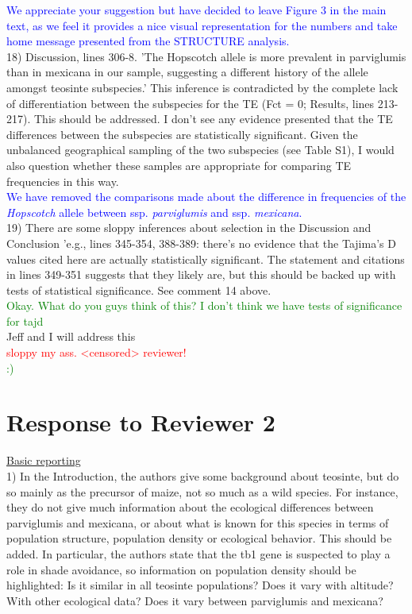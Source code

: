 \documentclass[11pt]{article}
\newcommand{\res}[1]{\noindent \textcolor{blue}{{#1}} \\}
\newcommand{\jri}[1]{\noindent \textcolor{red}{{#1}} \\}
\newcommand{\lev}[1]{\noindent \textcolor{green}{{#1}} \\}
\newcommand{\mbh}[1]{\noindent \textcolor{Dandelion}{{#1}}\\}
\begin{document}
\res{We appreciate your suggestion but have decided to leave Figure 3 in the main text, as we feel it provides a nice visual representation for the numbers and take home message presented from the STRUCTURE analysis.}

18) Discussion, lines 306-8. 'The Hopscotch allele is more prevalent in parviglumis than in mexicana in our sample, suggesting a different history of the allele amongst teosinte subspecies.' This inference is contradicted by the complete lack of differentiation between the subspecies for the TE (Fct = 0; Results, lines 213-217). This should be addressed. I don't see any evidence presented that the TE differences between the subspecies are statistically significant. Given the unbalanced geographical sampling of the two subspecies (see Table S1), I would also question whether these samples are appropriate for comparing TE frequencies in this way. \\

\res{We have removed the comparisons made about the difference in frequencies of the \emph{Hopscotch} allele between ssp. \emph{parviglumis} and ssp. \emph{mexicana}.}

19) There are some sloppy inferences about selection in the Discussion and Conclusion 'e.g., lines 345-354, 388-389: there's no evidence that the Tajima's D values cited here are actually statistically significant. The statement and citations in lines 349-351 suggests that they likely are, but this should be backed up with tests of statistical significance. See comment 14 above.\\

\lev{Okay. What do you guys think of this? I don't think we have tests of significance for tajd}

\mbh{Jeff and I will address this}
\jri{sloppy my ass. <censored> reviewer!}
\lev{ :) }


\section*{Response to Reviewer 2} 

\underline{Basic reporting}\\

1) In the Introduction, the authors give some background about teosinte, but do so mainly as the precursor of maize, not so much as a wild species. For instance, they do not give much information about the ecological differences between parviglumis and mexicana, or about what is known for this species in terms of population structure, population density or ecological behavior. This should be added. In particular, the authors state that the tb1 gene is suspected to play a role in shade avoidance, so information on population density should be highlighted: Is it similar in all teosinte populations? Does it vary with altitude? With other ecological data? Does it vary between parviglumis and mexicana?\\
\end{document}
